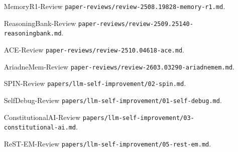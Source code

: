 \begin{itemize}[nosep]
\item [MemoryR1-Review] \texttt{paper-reviews/review-2508.19828-memory-r1.md}.
\item [ReasoningBank-Review] \texttt{paper-reviews/review-2509.25140-reasoningbank.md}.
\item [ACE-Review] \texttt{paper-reviews/review-2510.04618-ace.md}.
\item [AriadneMem-Review] \texttt{paper-reviews/review-2603.03290-ariadnemem.md}.
\item [SPIN-Review] \texttt{papers/llm-self-improvement/02-spin.md}.
\item [SelfDebug-Review] \texttt{papers/llm-self-improvement/01-self-debug.md}.
\item [ConstitutionalAI-Review] \texttt{papers/llm-self-improvement/03-constitutional-ai.md}.
\item [ReST-EM-Review] \texttt{papers/llm-self-improvement/05-rest-em.md}.
\end{itemize}
